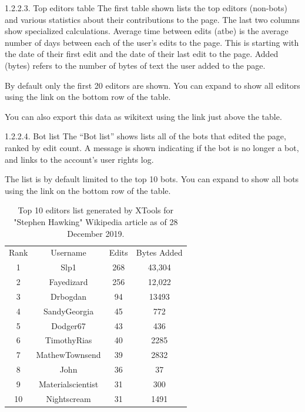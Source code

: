 \documentclass[12pt]{article}
\begin{document}
1.2.2.3. Top editors table
The first table shown lists the top editors (non-bots) and various statistics about their contributions to the page. The last two columns show specialized calculations. Average time between edits (atbe) is the average number of days between each of the user’s edits to the page. This is starting with the date of their first edit and the date of their last edit to the page. Added (bytes) refers to the number of bytes of text the user added to the page.

By default only the first 20 editors are shown. You can expand to show all editors using the link on the bottom row of the table.

You can also export this data as wikitext using the link just above the table.

1.2.2.4. Bot list
The “Bot list” shows lists all of the bots that edited the page, ranked by edit count. A message is shown indicating if the bot is no longer a bot, and links to the account’s user rights log.

The list is by default limited to the top 10 bots. You can expand to show all bots using the link on the bottom row of the table.


\begin{table}[]
\begin{tabular}{@{}cccc@{}}
\toprule
Rank & Username          & Edits & Bytes Added \\
\cmidrule(r){1-1}\cmidrule(lr){2-2}\cmidrule(l){3-3} \cmidrule(l){4-4}
1    & Slp1              & 268   & 43,304      \\ 
2    & Fayedizard        & 256   & 12,022      \\ 
3    & Drbogdan          & 94    & 13493       \\ 
4    & SandyGeorgia      & 45    & 772         \\ 
5    & Dodger67          & 43    & 436         \\ 
6    & TimothyRias       & 40    & 2285        \\ 
7    & MathewTownsend    & 39    & 2832        \\ 
8    & John              & 36    & 37          \\ 
9    & Materialscientist & 31    & 300         \\ 
10   & Nightscream       & 31    & 1491        \\ 
\bottomrule
\end{tabular}
\caption{Top 10 editors list generated by XTools for "Stephen Hawking" Wikipedia article as of 28 December 2019. }
\label{tab:Xtool_editor}
\end{table}
\end{document}
